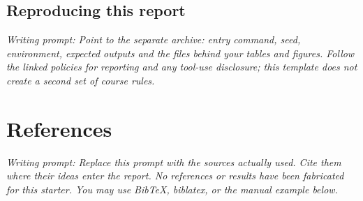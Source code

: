 \documentclass[11pt,a4paper]{article}
\newcommand{\prompt}[1]{{\small\color{PromptGrey}\textit{Writing prompt: #1}\par}}
\begin{document}
\subsection{Reproducing this report}
\prompt{Point to the separate archive: entry command, seed, environment,
expected outputs and the files behind your tables and figures. Follow the
linked policies for reporting and any tool-use disclosure; this template does
not create a second set of course rules.}

\clearpage
\section*{References}
\prompt{Replace this prompt with the sources actually used. Cite them where
their ideas enter the report. No references or results have been fabricated
for this starter. You may use BibTeX, biblatex, or the manual example below.}
\end{document}
